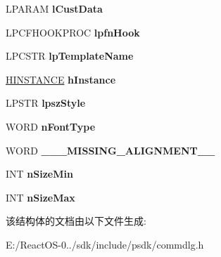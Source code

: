 \begin{DoxyCompactItemize}
L\+P\+A\+R\+AM {\bfseries l\+Cust\+Data}
\item 
\mbox{\label{structtag_c_h_o_o_s_e_f_o_n_t_a_a59669b776c0807cf21ebae4989af2526}} 
L\+P\+C\+F\+H\+O\+O\+K\+P\+R\+OC {\bfseries lpfn\+Hook}
\item 
\mbox{\label{structtag_c_h_o_o_s_e_f_o_n_t_a_a23ed6bc179832079ea707b842a09f8d1}} 
L\+P\+C\+S\+TR {\bfseries lp\+Template\+Name}
\item 
\mbox{\label{structtag_c_h_o_o_s_e_f_o_n_t_a_a56cdd9b27086eb4f8ba63f53ca18382d}} 
\hyperlink{interfacevoid}{H\+I\+N\+S\+T\+A\+N\+CE} {\bfseries h\+Instance}
\item 
\mbox{\label{structtag_c_h_o_o_s_e_f_o_n_t_a_a93ecb90a8b05567bb727a3b95a0ed141}} 
L\+P\+S\+TR {\bfseries lpsz\+Style}
\item 
\mbox{\label{structtag_c_h_o_o_s_e_f_o_n_t_a_ad02b4e2c9efcea688b483aed444b3eb9}} 
W\+O\+RD {\bfseries n\+Font\+Type}
\item 
\mbox{\label{structtag_c_h_o_o_s_e_f_o_n_t_a_a2ca8fb8074b2e1e71bbd7c206cf08942}} 
W\+O\+RD {\bfseries \+\_\+\+\_\+\+\_\+\+M\+I\+S\+S\+I\+N\+G\+\_\+\+A\+L\+I\+G\+N\+M\+E\+N\+T\+\_\+\+\_\+}
\item 
\mbox{\label{structtag_c_h_o_o_s_e_f_o_n_t_a_a505cf662a71fa6577cad4776d3071069}} 
I\+NT {\bfseries n\+Size\+Min}
\item 
\mbox{\label{structtag_c_h_o_o_s_e_f_o_n_t_a_a75e8d06bc2a4f5e45208c86bbf6b6863}} 
I\+NT {\bfseries n\+Size\+Max}
\end{DoxyCompactItemize}


该结构体的文档由以下文件生成\+:\begin{DoxyCompactItemize}
\item 
E\+:/\+React\+O\+S-\/0../sdk/include/psdk/commdlg.\+h\end{DoxyCompactItemize}
